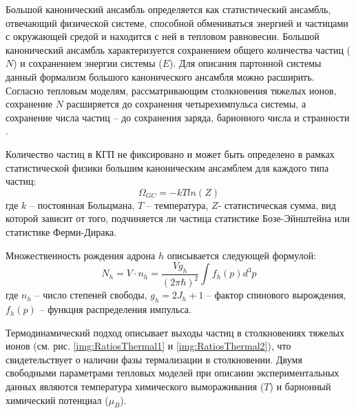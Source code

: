 Большой канонический ансамбль определяется как статистический ансамбль, отвечающий физической системе, способной обмениваться энергией и частицами с окружающей средой и находится с ней в тепловом равновесии.  Большой канонический ансамбль характеризуется сохранением общего количества частиц ($N$) и сохранением энергии системы ($E$). Для описания партонной системы данный формализм  большого канонического ансамбля можно расширить. Согласно тепловым моделям, рассматривающим столкновения тяжелых ионов, сохранение $N$ расширяется до сохранения четырехимпульса системы, а сохранение числа частиц -- до сохранения заряда, барионного числа и странности \cite{ThermalModel}. 

Количество частиц в КГП не фиксировано и может быть определено в рамках статистической физики большим каноническим ансамблем для каждого типа частиц:
$$\Omega_{GC} = -kT ln(Z)$$
где $k$ – постоянная Больцмана, 
$T$ – температура, 
$Z$- статистическая сумма, вид которой зависит от того, подчиняется ли частица статистике Бозе-Эйнштейна или статистике Ферми-Дирака.

Множественность рождения адрона $h$ описывается следующей формулой:
$$ N_h = V\cdot n_h = \frac{V g_h}{(2 \pi \hbar)^2} \int f_h(p)d^3p$$
где $n_h$ – число степеней свободы,
$g_h=2J_h+1$ – фактор спинового вырождения,
$f_h(p)$ -- функция распределения импульса.

\begin{comment}
	При взаимодействии частиц в адронном газе неизменными схраняющимися величинами являются барионное число, заряд и странность. Химический потенциал представляет собой линейную комбинацию трех потенциалов:
	
	$$\mu_h=h_B B_h + \mu_Q Q_h + \mu_S S_h$$
	где $B_h$ – барионное число адрона $h$, 
	$Q_h$- зарядовое число адрона $h$, 
	$S$ -  странность адрона $h$.
	Данная формула может быть расширена добавлением потоенциалов для C (charm) и B (bottomness) кварков.
\end{comment}

Термодинамический подход описывает выходы частиц в столкновениях тяжелых ионов (см. рис. \ref{img:RatiosThermal1} и \ref{img:RatiosThermal2}), что свидетельствует о наличии фазы термализации в столкновении. Двумя свободными параметрами тепловых моделей при описании экспериментальных данных являются температура химического вымораживания ($T$) и барионный химический потенциал ($\mu_B$).


